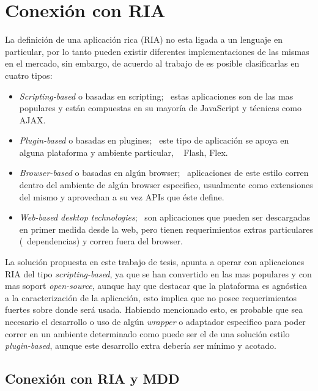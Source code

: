 \section{Conexión con RIA} \label{sec:extension_ria_conexion}

La definición de una aplicación rica (RIA) no esta ligada a un lenguaje en particular, por lo tanto pueden existir diferentes implementaciones de las mismas en el mercado, sin embargo, de acuerdo al trabajo de \citet{Bozzon2006} es posible clasificarlas en cuatro tipos:

\begin{itemize}
\item \emph{Scripting-based} o basadas en scripting; ~estas aplicaciones son de las mas populares y están compuestas en su mayoría de JavaScript y técnicas como AJAX.
\item \emph{Plugin-based} o basadas en plugines; ~este tipo de aplicación se apoya en alguna plataforma y ambiente particular, \eg~ Flash, Flex. 
\item \emph{Browser-based} o basadas en algún browser; ~aplicaciones de este estilo corren dentro del ambiente de algún browser especifico, usualmente como extensiones del mismo y aprovechan a su vez APIs que éste define.
\item \emph{Web-based desktop technologies}; ~son aplicaciones que pueden ser descargadas en primer medida desde la web, pero tienen requerimientos extras particulares (\ie ~dependencias) y corren fuera del browser.
\end{itemize}

La solución propuesta en este trabajo de tesis, apunta a operar con aplicaciones RIA del tipo \emph{scripting-based}, ya que se han convertido en las mas populares y con mas soport \emph{open-source}, aunque hay que destacar que la plataforma es agnóstica a la caracterización de la aplicación, esto implica que no posee requerimientos fuertes sobre donde será usada. Habiendo mencionado esto, es probable que sea necesario el desarrollo o uso de algún \emph{wrapper} o adaptador especifico para poder correr en un ambiente determinado como puede ser el de una solución estilo \emph{plugin-based}, aunque este desarrollo extra debería ser mínimo y acotado.

\subsection{Conexión con RIA y MDD} \label{sec:extension_ria_mdd_conexion}

